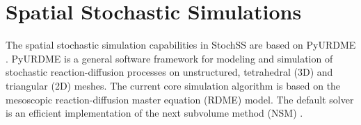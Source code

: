 \chapter{Spatial Stochastic Simulations}




The spatial stochastic simulation capabilities in StochSS are based on PyURDME \cite{urdme}. PyURDME is a general software framework for modeling and simulation of stochastic reaction-diffusion processes on unstructured, tetrahedral (3D) and triangular (2D) meshes. The current core simulation algorithm is based on the mesoscopic reaction-diffusion master equation (RDME) model. The default solver is an efficient implementation of the next subvolume method (NSM) \cite{nsm}.
%

